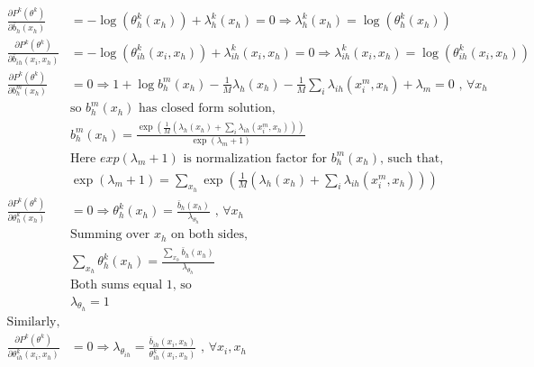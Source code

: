 \documentclass{article}
\begin{document}
\begin{align*}
\frac{\partial P^k(\theta^k)}{\partial \bar{b}_h(x_h)}&=-\log(\theta_h^k(x_h))+\lambda^k_h(x_h)=0\Rightarrow \lambda^k_h(x_h)=\log(\theta_h^k(x_h))\\
\frac{\partial P^k(\theta^k)}{\partial \bar{b}_{ih}(x_i,x_h)}&=-\log(\theta^k_{ih}(x_i,x_h))+\lambda^k_{ih}(x_i,x_h)=0\Rightarrow \lambda^k_{ih}(x_i,x_h)=\log(\theta^k_{ih}(x_i,x_h))\\
\frac{\partial P^k(\theta^k)}{\partial {b}_h^m(x_h)}&=0\Rightarrow  1+\log b_h^m(x_h)-\frac{1}{M}\lambda_h(x_h)-\frac{1}{M}\sum_i\lambda_{ih}(x_i^m,x_h)+\lambda_m=0\text{ ,  }\forall x_h\\
&\text{so $b_h^m(x_h)$ has closed form solution,}\\
&b_h^m(x_h)=\frac{\exp(\frac{1}{M}\left(\lambda_h(x_h)+\sum_i \lambda_{ih}(x_i^m,x_h)\right))}{\exp(\lambda_m + 1)}\\
&\text{Here $exp(\lambda_m + 1)$ is normalization factor for $b_h^m(x_h)$, such that,}\\
&\exp(\lambda_m+1)=\sum_{x_h}\exp\left(\frac{1}{M}\left(\lambda_h(x_h)+\sum_i \lambda_{ih}(x_i^m,x_h)\right)\right)\\
\frac{\partial P^k(\theta^k)}{\partial \theta_h^k(x_h)}&=0\Rightarrow \theta_h^k(x_h)=\frac{\bar{b}_h(x_h)}{\lambda_{\theta_h}}\text{ ,  }\forall x_h\\
&\text{Summing over $x_h$ on both sides,}\\
&\sum_{x_h}\theta_h^k(x_h)=\frac{\sum_{x_h}\bar{b}_h(x_h)}{\lambda_{\theta_h}}\\
&\text{Both sums equal 1, so}\\
&\lambda_{\theta_h}=1\\
\text{Similarly,}\\
\frac{\partial P^k(\theta^k)}{\partial \theta_{ih}^k(x_i,x_h)}&=0\Rightarrow \lambda_{\theta_{ih}}=\frac{ \bar{b}_{ih}(x_i,x_h)}{\theta_{ih}^k(x_i,x_h)}\text{ ,  }\forall x_i,x_h\\
\end{align*}
\end{document}
